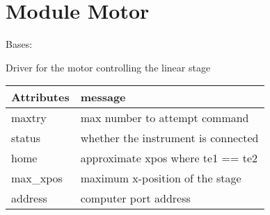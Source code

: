 \documentclass[letterpaper,10pt,english]{sphinxmanual}
\begin{document}
\section{Module Motor}
\label{\detokenize{source/laboratory.drivers:module-laboratory.drivers.motor}}\label{\detokenize{source/laboratory.drivers:module-motor}}

\begin{fulllineitems}
\label{\detokenize{source/laboratory.drivers:laboratory.drivers.motor.Motor}}
Bases: 

Driver for the motor controlling the linear stage


\begin{savenotes}\sphinxattablestart
\centering
\begin{tabulary}{\linewidth}[t]{|T|T|}
\hline
\sphinxstyletheadfamily 
Attributes
&\sphinxstyletheadfamily 
message
\\
\hline
maxtry
&
max number to attempt command
\\
\hline
status
&
whether the instrument is connected
\\
\hline
home
&
approximate xpos where te1 == te2
\\
\hline
max\_xpos
&
maximum x-position of the stage
\\
\hline
address
&
computer port address
\\
\hline
\end{tabulary}
\par
\sphinxattableend\end{savenotes}



\end{fulllineitems}
\end{document}
